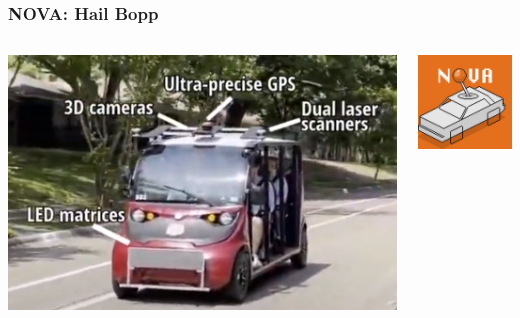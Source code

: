 \documentclass[aspectratio=169]{beamer}
\begin{document}
\begin{frame}
	\frametitle{NOVA: Hail Bopp \cite{nova}}
	\begin{columns}
		\begin{column}{0.25\textwidth}
			\includegraphics[width=\columnwidth]{figs/NOVA-annotatedImage.png}
		\end{column}
		\begin{column}{0.3\textwidth}
			\includegraphics[width=\columnwidth]{figs/NOVA-logo.png}
		\end{column}
	\end{columns}
\end{frame}
\end{document}
